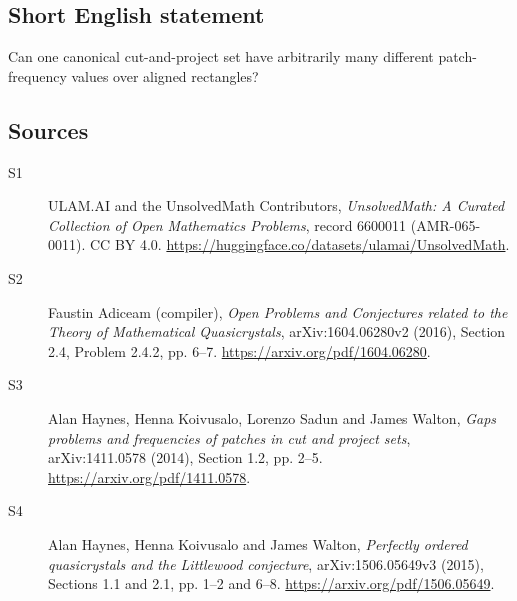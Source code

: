 \documentclass[11pt]{article}
\begin{document}
\subsection{Short English statement}
Can one canonical cut-and-project set have arbitrarily many different patch-frequency values over aligned rectangles?
\subsection{Sources}
\begin{description}
\item[\hypertarget{source:6600011:1}{S1}] ULAM.AI and the UnsolvedMath Contributors, \emph{UnsolvedMath: A Curated Collection of Open Mathematics Problems}, record 6600011 (AMR-065-0011). CC BY 4.0. \url{https://huggingface.co/datasets/ulamai/UnsolvedMath}.
\item[\hypertarget{source:6600011:2}{S2}] Faustin Adiceam (compiler), \emph{Open Problems and Conjectures related to the Theory of Mathematical Quasicrystals}, arXiv:1604.06280v2 (2016), Section 2.4, Problem 2.4.2, pp. 6--7. \url{https://arxiv.org/pdf/1604.06280}.
\item[\hypertarget{source:6600011:3}{S3}] Alan Haynes, Henna Koivusalo, Lorenzo Sadun and James Walton, \emph{Gaps problems and frequencies of patches in cut and project sets}, arXiv:1411.0578 (2014), Section 1.2, pp. 2--5. \url{https://arxiv.org/pdf/1411.0578}.
\item[\hypertarget{source:6600011:4}{S4}] Alan Haynes, Henna Koivusalo and James Walton, \emph{Perfectly ordered quasicrystals and the Littlewood conjecture}, arXiv:1506.05649v3 (2015), Sections 1.1 and 2.1, pp. 1--2 and 6--8. \url{https://arxiv.org/pdf/1506.05649}.
\end{description}
\label{end:6600011}
\end{document}
